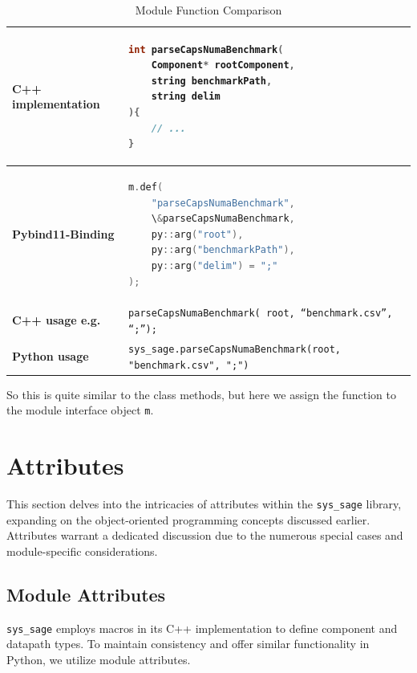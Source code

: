 \begin{table}[htbp]
\centering
\begin{tabular}{|l|l|}
\hline
\textbf{C++ implementation} &
\begin{lstlisting}[language=C++]
int parseCapsNumaBenchmark(
    Component* rootComponent,
    string benchmarkPath,
    string delim
){
    // ...
}
\end{lstlisting}
\\ \hline
\textbf{Pybind11-Binding} &
\begin{lstlisting}[language=C++]
m.def(
    "parseCapsNumaBenchmark",
    \&parseCapsNumaBenchmark,
    py::arg("root"),
    py::arg("benchmarkPath"),
    py::arg("delim") = ";"
);
\end{lstlisting}
\\ \hline
\textbf{C++ usage e.g.} &
\verb|parseCapsNumaBenchmark( root, “benchmark.csv”, “;”);| \\ \hline
\textbf{Python usage} &
\verb|sys_sage.parseCapsNumaBenchmark(root, "benchmark.csv", ";")| \\ \hline
\end{tabular}
\caption{Module Function Comparison}
\label{tab:module_functions}
\end{table}

So this is quite similar to the class methods, but here we assign the function to the module interface object \verb|m|.\cite[see Reference/Conveneince Classes for specific Python types]{pybind11-docu}
\newpage


\section{Attributes}

This section delves into the intricacies of attributes within the \verb|sys_sage| library, expanding on the object-oriented programming concepts discussed earlier. Attributes warrant a dedicated discussion due to the numerous special cases and module-specific considerations.

\subsection{Module Attributes}

\verb|sys_sage| employs macros in its C++ implementation to define component and datapath types. To maintain consistency and offer similar functionality in Python, we utilize module attributes. 

